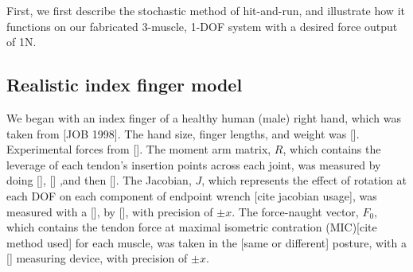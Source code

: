 First, we first describe the stochastic method of hit-and-run, and illustrate how it functions on our fabricated 3-muscle, 1-DOF system with a desired force output of 1N.




\subsection{Realistic index finger model}
\label{ss:finger}
We began with an index finger of a healthy human (male) right hand, which was taken from [JOB 1998]. The hand size, finger lengths, and weight was []. Experimental forces from []. 
The moment arm matrix, $R$, which contains the leverage of each tendon's insertion points across each joint, was measured by doing [], [] ,and then [].
The Jacobian, $J$, which represents the effect of rotation at each DOF on each component of endpoint wrench [cite jacobian usage], was measured with a [], by [], with precision of $\pm x$.
The force-naught vector, $F_0$, which contains the tendon force at maximal isometric contration (MIC)[cite method used] for each muscle, was taken in the [same or different] posture, with a [] measuring device, with precision of $\pm x$.

